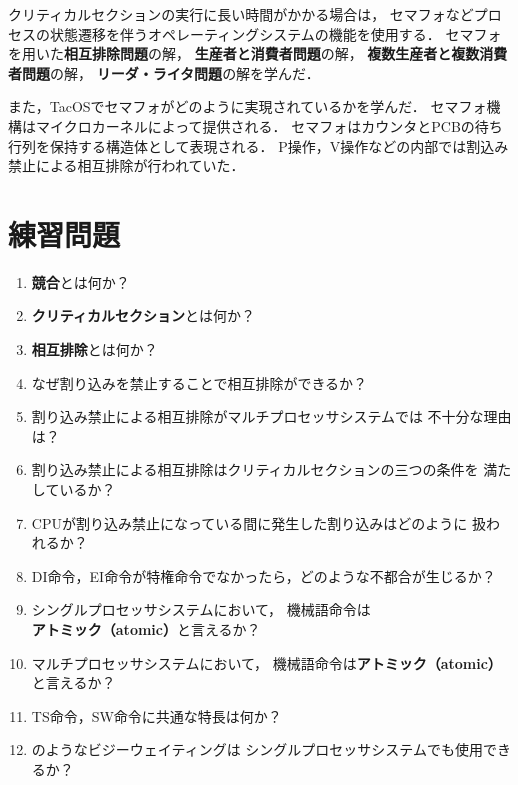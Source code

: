 クリティカルセクションの実行に長い時間がかかる場合は，
セマフォなどプロセスの状態遷移を伴うオペレーティングシステムの機能を使用する．
セマフォを用いた{\bf 相互排除問題}の解，
{\bf 生産者と消費者問題}の解，
{\bf 複数生産者と複数消費者問題}の解，
{\bf リーダ・ライタ問題}の解を学んだ．

また，TacOSでセマフォがどのように実現されているかを学んだ．
セマフォ機構はマイクロカーネルによって提供される．
セマフォはカウンタとPCBの待ち行列を保持する構造体として表現される．
P操作，V操作などの内部では割込み禁止による相互排除が行われていた．

\section*{練習問題}
\begin{enumerate}
\renewcommand{\labelenumi}{\tt \arabic{chapter}.\arabic{enumi}}
 \setlength{\leftskip}{1em}

\item {\bf 競合}とは何か？

\item {\bf クリティカルセクション}とは何か？

\item {\bf 相互排除}とは何か？

\item なぜ割り込みを禁止することで相互排除ができるか？

\item 割り込み禁止による相互排除がマルチプロセッサシステムでは
不十分な理由は？

\item 割り込み禁止による相互排除はクリティカルセクションの三つの条件を
満たしているか？

\item CPUが割り込み禁止になっている間に発生した割り込みはどのように
扱われるか？

\item DI命令，EI命令が特権命令でなかったら，どのような不都合が生じるか？

\item シングルプロセッサシステムにおいて，
機械語命令は{\bf アトミック（atomic）}と言えるか？

\item マルチプロセッサシステムにおいて，
機械語命令は{\bf アトミック（atomic）}と言えるか？

\item TS命令，SW命令に共通な特長は何か？

\item {}のようなビジーウェイティングは
シングルプロセッサシステムでも使用できるか？


\end{enumerate}
